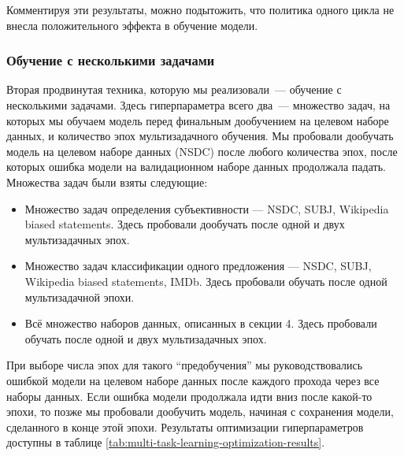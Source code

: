 \documentclass[a4paper,14pt]{extarticle}
\begin{document}
    Комментируя эти результаты, можно подытожить, что политика одного цикла не внесла положительного эффекта в обучение модели.
    \subsubsection{Обучение с несколькими задачами}
    Вторая продвинутая техника, которую мы реализовали~--- обучение с несколькими задачами. Здесь гиперпараметра всего два~--- множество задач, на которых мы обучаем модель перед финальным дообучением на целевом наборе данных, и количество эпох мультизадачного обучения. Мы пробовали дообучать модель на целевом наборе данных (NSDC) после любого количества эпох, после которых ошибка модели на валидационном наборе данных продолжала падать. Множества задач были взяты следующие: 
    \begin{itemize}
        \item Множество задач определения субъективности --- NSDC, SUBJ, Wikipedia biased statements. Здесь пробовали дообучать после одной и двух мультизадачных эпох.
        \item Множество задач классификации одного предложения --- NSDC, SUBJ, Wikipedia biased statements, IMDb. Здесь пробовали обучать после одной мультизадачной эпохи.
        \item Всё множество наборов данных, описанных в секции 4. Здесь пробовали обучать после одной и двух мультизадачных эпох.
    \end{itemize}
    При выборе числа эпох для такого ``предобучения'' мы руководствовались ошибкой модели на целевом наборе данных после каждого прохода через все наборы данных. Если ошибка модели продолжала идти вниз после какой-то эпохи, то позже мы пробовали дообучить модель, начиная с сохранения модели, сделанного в конце этой эпохи. Результаты оптимизации гиперпараметров доступны в таблице \ref{tab:multi-task-learning-optimization-results}.
\end{document}
